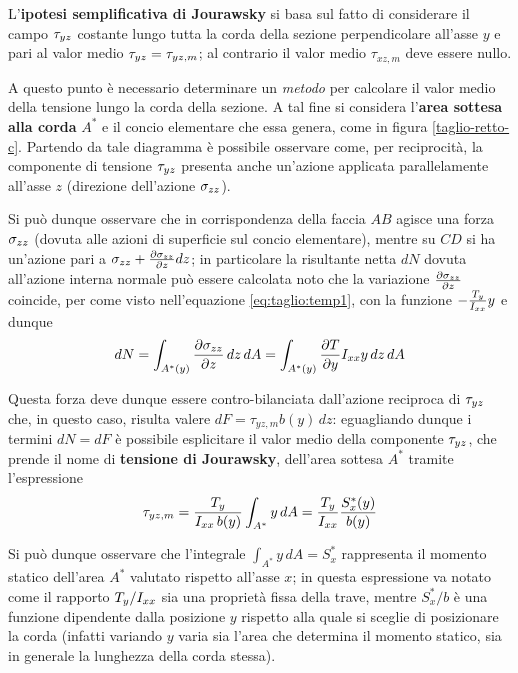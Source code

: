 		\begin{concetto}
			L'\textbf{ipotesi semplificativa di Jourawsky} si basa sul fatto di considerare il campo $\tau_{yz}$ costante lungo tutta la corda della sezione perpendicolare all'asse $y$ e pari al valor medio $\tau_{yz} = \tau_{yz,m}$; al contrario il valor medio $\tau_{xz,m}$ deve essere nullo.
		\end{concetto}
		
		A questo punto è necessario determinare un \textit{metodo} per calcolare il valor medio della tensione lungo la corda della sezione. A tal fine si considera l'\textbf{area sottesa alla corda} $A^*$ e il concio elementare che essa genera, come in figura \ref{taglio-retto-c}. Partendo da tale diagramma è possibile osservare come, per reciprocità, la componente di tensione $\tau_{yz}$ presenta anche un'azione applicata parallelamente all'asse $z$ (direzione dell'azione $\sigma_{zz}$).
		
		
		Si può dunque osservare che in corrispondenza della faccia $AB$ agisce una forza $\sigma_{zz}$ (dovuta alle azioni di superficie sul concio elementare), mentre su $CD$ si ha un'azione pari a $\sigma_{zz} + \frac{\partial \sigma_{zz}}{\partial z} dz$; in particolare la risultante netta $dN$ dovuta all'azione interna normale può essere calcolata noto che la variazione $\frac{\partial \sigma_{zz}}{\partial z}$ coincide, per come visto nell'equazione \ref{eq:taglio:temp1}, con la funzione $-\frac {T_y}{I_{xx}} y$ e dunque
		\[ dN = \int_{A^*(y)} \frac{\partial \sigma_{zz}}{\partial z} \, dz\, dA = \int_{A^*(y)} \frac{\partial T}{\partial y} I_{xx} y \, dz \, dA \]
		
		\begin{concetto}
			Questa forza deve dunque essere contro-bilanciata dall'azione reciproca di $\tau_{yz}$ che, in questo caso, risulta valere $dF = \tau_{yz,m} b(y)\, dz$: eguagliando dunque i termini $dN = dF$ è possibile esplicitare il valor medio della componente $\tau_{yz}$, che prende il nome di \textbf{tensione di Jourawsky}, dell'area sottesa $A^*$ tramite l'espressione
			\begin{equation} \label{eq:taglio:retto}
				\tau_{yz,m} = \frac{T_y  }{I_{xx} \, b(y)}\int_{A^*} y\, dA  = \frac{T_y  }{I_{xx}} \frac {S_x^*(y)}{ b(y)}
			\end{equation}
		\end{concetto}
		Si può dunque osservare che l'integrale $\int_{A^*}y\,dA = S_x^*$ rappresenta il momento statico dell'area $A^*$ valutato rispetto all'asse $x$; in questa espressione va notato come il rapporto $T_y/I_{xx}$ sia una proprietà fissa della trave, mentre $S_x^*/b$ è una funzione dipendente dalla posizione $y$ rispetto alla quale si sceglie di posizionare la corda (infatti variando $y$ varia sia l'area che determina il momento statico, sia in generale la lunghezza della corda stessa).
		
